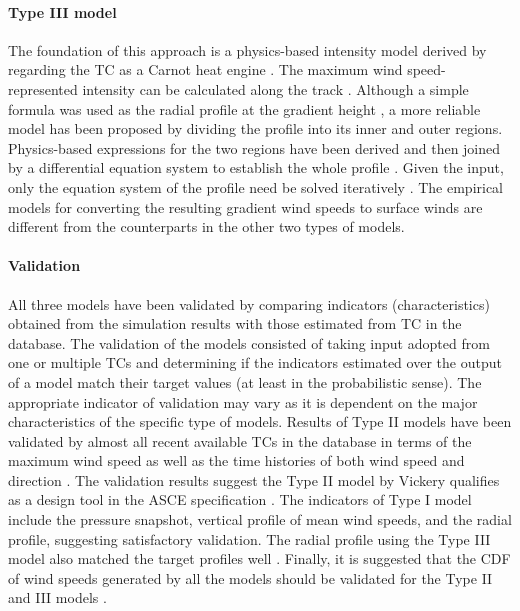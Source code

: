 \paragraph{Type III model} The foundation of this approach is a physics-based intensity model derived by regarding the TC as a Carnot heat engine \citep{emanuel2004tropical,emanuel1988maximum}. The maximum wind speed-represented intensity can be calculated along the track \citep{emanuel2011selfstratification}. Although a simple formula was used as the radial profile at the gradient height \citep{emanuel2006statistical,lin2012hurricane}, a more reliable model has been proposed by dividing the profile into its inner and outer regions. Physics-based expressions for the two regions have been derived and then joined by a differential equation system to establish the whole profile \citep{emanuel2004tropical,emanuel2011selfstratificationa}. Given the input, only the equation system of the profile need be solved iteratively \citep{chavas2016model,chavas2015model} . The empirical models for converting the resulting gradient wind speeds to surface winds are different from the counterparts in the other two types of models. 

\paragraph{Validation} All three models have been validated by comparing indicators (characteristics) obtained from the simulation results with those estimated from TC in the database. The validation of the models consisted of taking input adopted from one or multiple TCs and determining if the indicators estimated over the output of a model match their target values (at least in the probabilistic sense). The appropriate indicator of validation may vary as it is dependent on the major characteristics of the specific type of models. Results of Type II models have been validated by almost all recent available TCs in the database in terms of the maximum wind speed as well as the time histories of both wind speed and direction \citep{li2016typhoona, vickery2000hurricane, vickery2009hurricane-b}. The validation results suggest the Type II model by Vickery qualifies as a design tool in the ASCE specification \citep{vickery2009hurricane-c}. The indicators of Type I model include the pressure snapshot, vertical profile of mean wind speeds, and the radial profile, suggesting satisfactory validation. The radial profile using the Type III model also matched the target profiles well \citep{chavas2015model,emanuel2004tropical,emanuel2006statistical}. Finally, it is suggested that the CDF of wind speeds generated by all the models should be validated for the Type II and III models \cite[e.g.,][]{emanuel2006statistical, li2016typhoon}. 

